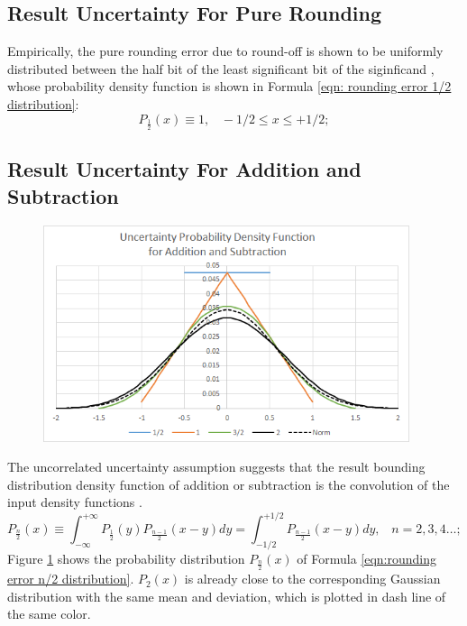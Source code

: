 \documentclass[twoside]{article}
\numberwithin{equation}{section}
\newcommand{\eqspace}{\;\;\;}
\begin{document}
\subsection{Result Uncertainty For Pure Rounding  \cite{Prev_Precision_Arithmetic}}

Empirically, the pure rounding error due to round-off is shown to be uniformly distributed between the half bit of the least significant bit of the siginficand \cite{Prev_Precision_Arithmetic}, whose probability density function is shown in Formula \eqref{eqn: rounding error 1/2 distribution}:
\begin{equation}
\label{eqn: rounding error 1/2 distribution}
P_{\frac{1}{2}}(x) \equiv 1, \eqspace  -1/2 \leq x \leq +1/2; 
\end{equation}



\subsection{Result Uncertainty For Addition and Subtraction  \cite{Prev_Precision_Arithmetic}}

\begin{figure}
\centering
\includegraphics[height=2.5in]{Prec_Add_ErrDist.png} 
\label{fig: Prec_Add_Err_Dist}
\end{figure}


The uncorrelated uncertainty assumption suggests that the result bounding distribution density function of addition or subtraction is the convolution of the input density functions \cite{Probability_Statistics}.  
\begin{equation}
\label{eqn:rounding error n/2 distribution}
P_{\frac{n}{2}}(x) \equiv \int _{-\infty}^{+\infty}P_{\frac{1}{2}}(y)P_{\frac{n-1}{2}}(x-y)dy=\int _{-1/2}^{+1/2}P_{\frac{n-1}{2}}(x-y) dy,\eqspace n=2,3,4\dots;
\end{equation}
Figure \ref{fig: Prec_Add_Err_Dist} shows the probability distribution $P_{\frac{n}{2}}(x)$ of Formula \eqref{eqn:rounding error n/2 distribution}.  
$P_{2}(x)$ is already close to the corresponding Gaussian distribution with the same mean and deviation, which is plotted in dash line of the same color.
\end{document}
